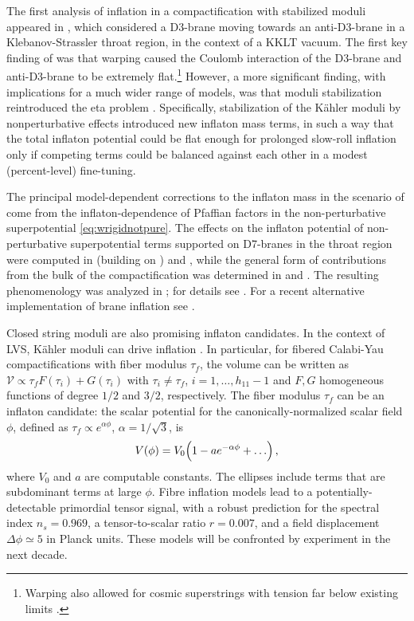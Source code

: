 \documentclass[12pt,a4wide]{article}
\def\V{\mathcal{V}}
\def\be{\begin{equation}}
\def\ee{\end{equation}}
\begin{document}
The first analysis of inflation 
in a compactification with stabilized moduli appeared in \cite{Kachru:2003sx}, which considered a D3-brane moving towards an anti-D3-brane in a Klebanov-Strassler throat region, in the context of a KKLT vacuum.  The first key finding of \cite{Kachru:2003sx} was that warping caused the Coulomb interaction of the D3-brane and anti-D3-brane to be extremely flat.\footnote{Warping also allowed for cosmic superstrings with tension far below existing limits \cite{Kachru:2003sx,Copeland:2003bj}.}  However, a more significant finding, with implications for a much wider range of models, was that moduli stabilization reintroduced the eta problem \cite{Kachru:2003sx}.  Specifically, stabilization of the K\"ahler moduli by nonperturbative effects introduced new inflaton mass terms, in such a way that the total inflaton potential could be flat enough for prolonged slow-roll inflation only if competing terms could be balanced against each other in a modest (percent-level) fine-tuning.

The principal model-dependent corrections to the inflaton mass in the scenario of \cite{Kachru:2003sx} come from the inflaton-dependence of Pfaffian factors in the non-perturbative superpotential \eqref{eq:wrigidnotpure}.  The effects on the inflaton potential of non-perturbative superpotential terms supported on D7-branes in the throat region were computed in \cite{Baumann:2006cd}
(building on \cite{Berg:2004ek}) and \cite{Baumann:2007ah}, while the general form of contributions from the bulk of the compactification was determined in \cite{Baumann:2008kq} and \cite{Baumann:2010sx}.
The resulting phenomenology was analyzed in \cite{Agarwal:2011wm,McAllister:2012am}; for details see \cite{Baumann:2014nda}.
For a recent alternative implementation of brane inflation see \cite{Burgess:2022nbx}.

Closed string moduli are also promising inflaton candidates.
In the context of LVS, K\"ahler moduli can drive inflation \cite{Conlon:2005jm,Cicoli:2008gp}. In particular, for fibered Calabi-Yau compactifications with fiber modulus $\tau_f$, the volume can be written as
$\V\propto \tau_f F(\tau_i)+G(\tau_i)$ with  $\tau_i\neq \tau_f$, $i=1,\ldots, h_{11}-1$ and $F,G$ homogeneous functions of degree $1/2$ and $3/2$, respectively. The fiber modulus $\tau_f$ can be an inflaton candidate: the scalar potential for the canonically-normalized scalar field $\phi$, defined as $\tau_f\propto e^{\alpha\phi}$, $\alpha=1/\sqrt{3}$, is
\be
V(\phi)=V_0\Bigl(1-ae^{-\alpha \phi}+\ldots\Bigr)\,,
\ee
where $V_0$ and $a$ are computable constants. The ellipses include terms that are subdominant terms at large $\phi$.
Fibre{\texttrademark}  
inflation models lead to a potentially-detectable primordial tensor signal, with a robust prediction for the spectral index $n_s=0.969$, a tensor-to-scalar ratio $r=0.007$, and a field displacement $\Delta\phi\simeq 5$ in Planck units. These models will be confronted by experiment in the next decade.
\end{document}
